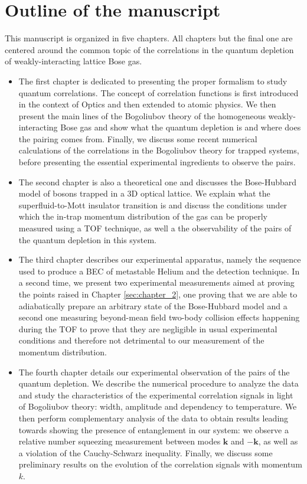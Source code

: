 \section*{Outline of the manuscript}

This manuscript is organized in five chapters. All chapters but the final one are centered around the common topic of the \kmk correlations in the quantum depletion of weakly-interacting lattice Bose gas.

\begin{itemize}
    \item The first chapter is dedicated to presenting the proper formalism to study quantum correlations. The concept of correlation functions is first introduced in the context of Optics and then extended to atomic physics. We then present the main lines of the Bogoliubov theory of the homogeneous weakly-interacting Bose gas and show what the quantum depletion is and where does the \kmk pairing comes from. Finally, we discuss some recent numerical calculations \cite{butera2020} of the correlations in the Bogoliubov theory for trapped systems, before presenting the essential experimental ingredients to observe the \kmk pairs.
    \item The second chapter is also a theoretical one and discusses the Bose-Hubbard model of bosons trapped in a 3D optical lattice. We explain what the superfluid-to-Mott insulator transition is and discuss the conditions under which the in-trap momentum distribution of the gas can be properly measured using a TOF technique, as well a the observability of the \kmk pairs of the quantum depletion in this system.
    \item The third chapter describes our experimental apparatus, namely the sequence used to produce a BEC of metastable Helium and the detection technique. In a second time, we present two experimental measurements aimed at proving the points raised in Chapter \ref{sec:chapter_2}, one proving that we are able to adiabatically prepare an arbitrary state of the Bose-Hubbard model and a second one measuring beyond-mean field two-body collision effects happening during the TOF to prove that they are negligible in usual experimental conditions and therefore not detrimental to our measurement of the momentum distribution. 
    \item The fourth chapter details our experimental observation of the \kmk pairs of the quantum depletion. We describe the numerical procedure to analyze the data and study the characteristics of the experimental correlation signals in light of Bogoliubov theory: width, amplitude and dependency to temperature. We then perform complementary analysis of the data to obtain results leading towards showing the presence of entanglement in our system: we observe a relative number squeezing measurement between modes $\bm{k}$ and $-\bm{k}$, as well as a violation of the Cauchy-Schwarz inequality. Finally, we discuss some preliminary results on the evolution of the correlation signals with momentum $k$.

\end{itemize}
